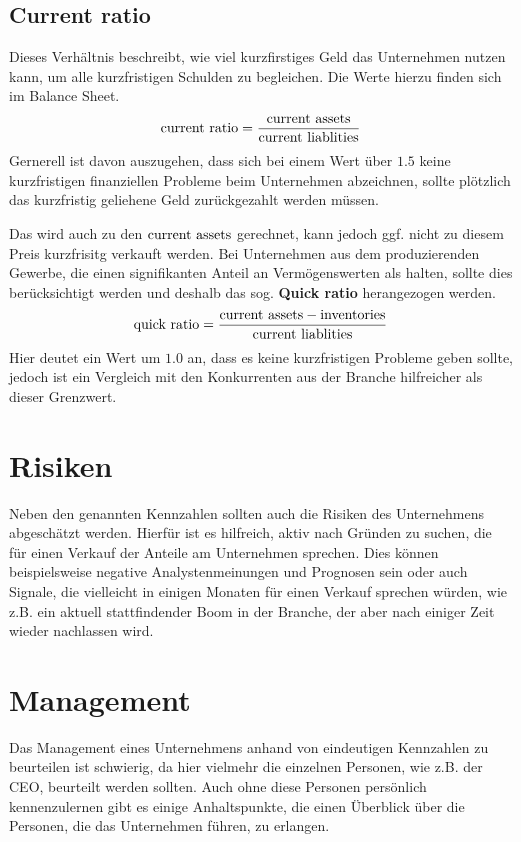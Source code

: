 %
\subsection{Current ratio}
\label{sec:current_ratio}

Dieses Verhältnis beschreibt, wie viel kurzfirstiges Geld das Unternehmen nutzen kann, um alle kurzfristigen Schulden zu begleichen.
Die Werte hierzu finden sich im Balance Sheet.
\begin{equation}
    \text{current ratio} = \frac{\text{current assets}}{\text{current liablities}}
\end{equation}
Gernerell ist davon auszugehen, dass sich bei einem Wert über $1.5$ keine kurzfristigen finanziellen Probleme beim Unternehmen abzeichnen, sollte plötzlich das kurzfristig geliehene Geld zurückgezahlt werden müssen.

Das \inventories wird auch zu den $\text{current assets}$ gerechnet, kann jedoch ggf. nicht zu diesem Preis kurzfrisitg verkauft werden. 
Bei Unternehmen aus dem produzierenden Gewerbe, die einen signifikanten Anteil an Vermögenswerten als \inventories halten, sollte dies berücksichtigt werden und deshalb das sog. \textbf{Quick ratio} herangezogen werden.
\begin{equation}
    \text{quick ratio} = \frac{\text{current assets} - \text{inventories}}{\text{current liablities}}
\end{equation}
Hier deutet ein Wert um $1.0$ an, dass es keine kurzfristigen Probleme geben sollte, jedoch ist ein Vergleich mit den Konkurrenten aus der Branche hilfreicher als dieser Grenzwert.

%
\section{Risiken}
Neben den genannten Kennzahlen sollten auch die Risiken des Unternehmens abgeschätzt werden.
Hierfür ist es hilfreich, aktiv nach Gründen zu suchen, die für einen Verkauf der Anteile am Unternehmen sprechen.
Dies können beispielsweise negative Analystenmeinungen und Prognosen sein oder auch Signale, die vielleicht in einigen Monaten für einen Verkauf sprechen würden, wie z.B. ein aktuell stattfindender Boom in der Branche, der aber nach einiger Zeit wieder nachlassen wird.

%
\section{Management}
Das Management eines Unternehmens anhand von eindeutigen Kennzahlen zu beurteilen ist schwierig, da hier vielmehr die einzelnen Personen, wie z.B. der CEO, beurteilt werden sollten.
Auch ohne diese Personen persönlich kennenzulernen gibt es einige Anhaltspunkte, die einen Überblick über die Personen, die das Unternehmen führen, zu erlangen.

